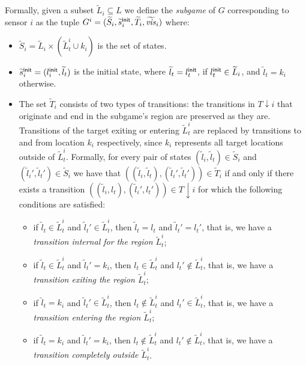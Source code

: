 Formally, given a subset  $\widetilde{L}_i \subseteq L$ we define the \emph{subgame} of $G$ corresponding to sensor $i$ as the tuple $G^i = (\widetilde{S}_i,\widetilde{s}_i^{\mathsf{init}},\widetilde{T}_i,\widetilde{\mathit{vis}}_i)$  where:
\begin{itemize}
\item $\widetilde{S}_i= \widetilde{L}_i \times (\widetilde{L}^i_t \cup k_i)$ is the set of states.
\item $\widetilde s_i^{\mathsf{init}} = (l_i^{\mathsf{init}},\widetilde l_t)$ is the initial state, where $\widetilde l_t =  l_t^{\mathsf{init}}$, if
$ l_t^{\mathsf{init}} \in \widetilde L_i$, and $\widetilde l_t = k_i$ otherwise.
\item The set $\widetilde{T}_i$ consists of two types of transitions: the transitions in $T{\downarrow } i$ that originate and end in the subgame's region are preserved as they are. Transitions of the target exiting or entering $\widetilde{L}^i_t$ are replaced by transitions to and from location $k_i$ respectively, since $k_i$ represents all target locations outside of  $\widetilde{L}^i_t$. 
Formally, for every pair of states $(\widetilde{l}_i,\widetilde{l}_t) \in \widetilde{S}_i$ and $(\widetilde{l}_i',\widetilde{l}_t') \in \widetilde{S}_i$ we have that $((\widetilde{l}_i,\widetilde l_t),(\widetilde{l}_i',\widetilde l_t')) \in \widetilde T_i$ if and only if there exists a transition
 $((\widetilde{l}_i,l_t),(\widetilde{l}_i',l_t')) \in T{\downarrow}i$ for which the following conditions are satisfied:
 \begin{itemize}
 \item if $\widetilde l_t \in \widetilde L_t ^i$ and $\widetilde l_t' \in \widetilde L_t ^i$, then 
 $\widetilde l_t = l_t$ and $\widetilde l_t'= l_t'$, that is, we have a \emph{transition internal for the region $\widetilde L_t^i$};
 \item if $\widetilde l_t \in \widetilde L_t ^i$ and $\widetilde l_t' =  k_i$, then 
 $l_t \in \widetilde L_t^i$ and $l_t' \not\in \widetilde L_t^i$, that is, we have a \emph{transition exiting the region $\widetilde L_t^i$}; 
 \item if $\widetilde l_t= k_i$ and $\widetilde l_t' \in  \widetilde L_t ^i$, then 
 $l_t \not \in \widetilde L_t^i$ and $l_t' \in \widetilde L_t^i$, that is, we have a \emph{transition entering the region $\widetilde L_t^i$}; 
 \item if $\widetilde l_t= k_i$ and $\widetilde l_t' =  k_i$, then 
 $l_t \not \in \widetilde L_t^i$ and $l_t' \not\in \widetilde L_t^i$, that is, we have a \emph{transition completely outside $\widetilde L_t^i$}.
\end{itemize}  


\end{itemize}

